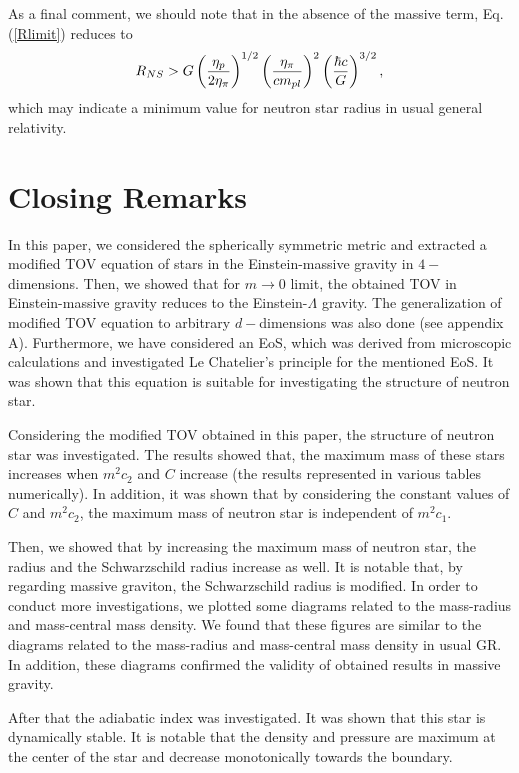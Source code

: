 \documentclass[aps]{revtex4}
\begin{document}
As a final comment, we should note that in the absence of the massive term,
Eq. (\ref{Rlimit}) reduces to
\begin{equation}
R_{NS}>G\left( \frac{\eta _{p}}{2\eta _{\pi }}\right) ^{1/2}\left( \frac{%
\eta _{\pi }}{cm_{pl}}\right) ^{2}\left( \frac{\hbar c}{G}\right) ^{3/2},
\end{equation}%
which may indicate a minimum value for neutron star radius in usual general
relativity.

\section{Closing Remarks \label{CONCLUSION}}

In this paper, we considered the spherically symmetric metric and extracted
a modified TOV equation of stars in the Einstein-massive gravity in $4-$%
dimensions. Then, we showed that for $m\rightarrow 0$ limit, the obtained
TOV in Einstein-massive gravity reduces to the Einstein-$\Lambda $ gravity.
The generalization of modified TOV equation to arbitrary $d-$dimensions was
also done (see appendix A). Furthermore, we have considered an EoS, which
was derived from microscopic calculations and investigated Le Chatelier's
principle for the mentioned EoS. It was shown that this equation is suitable
for investigating the structure of neutron star.

Considering the modified TOV obtained in this paper, the structure
of neutron star was investigated. The results showed that, the
maximum mass of these stars increases when $m^{2}c_{2}$ and $C$
increase (the results represented in various tables numerically).
In addition, it was shown that by considering the constant values
of $C$ and $m^{2}c_{2}$, the maximum mass of neutron star is
independent of $m^{2}c_{1}$.

Then, we showed that by increasing the maximum mass of neutron star, the
radius and the Schwarzschild radius increase as well. It is notable that, by
regarding massive graviton, the Schwarzschild radius is modified. In order
to conduct more investigations, we plotted some diagrams related to the
mass-radius and mass-central mass density. We found that these figures are
similar to the diagrams related to the mass-radius and mass-central mass
density in usual GR. In addition, these diagrams confirmed the validity of
obtained results in massive gravity.

After that the adiabatic index was investigated. It was shown that
this star is dynamically stable. It is notable that the density
and pressure are maximum at the center of the star and decrease
monotonically towards the boundary.
\end{document}
